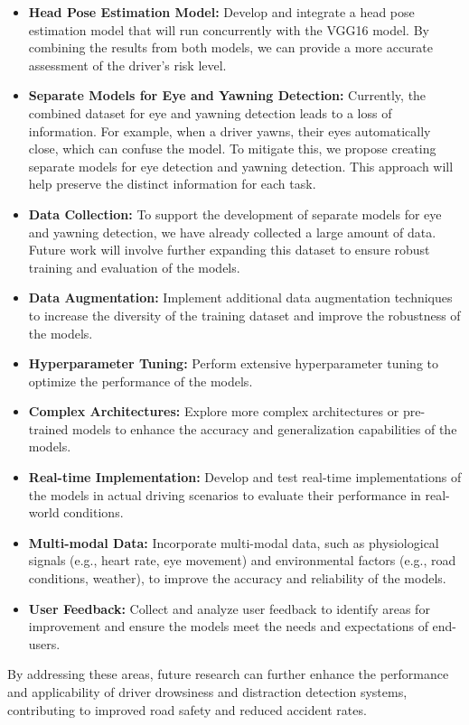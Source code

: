 \begin{itemize}
    \item \textbf{Head Pose Estimation Model:} Develop and integrate a head pose estimation model that will run concurrently with the VGG16 model. By combining the results from both models, we can provide a more accurate assessment of the driver's risk level.
    \item \textbf{Separate Models for Eye and Yawning Detection:} Currently, the combined dataset for eye and yawning detection leads to a loss of information. For example, when a driver yawns, their eyes automatically close, which can confuse the model. To mitigate this, we propose creating separate models for eye detection and yawning detection. This approach will help preserve the distinct information for each task.
    \item \textbf{Data Collection:} To support the development of separate models for eye and yawning detection, we have already collected a large amount of data. Future work will involve further expanding this dataset to ensure robust training and evaluation of the models.
    \item \textbf{Data Augmentation:} Implement additional data augmentation techniques to increase the diversity of the training dataset and improve the robustness of the models.
    \item \textbf{Hyperparameter Tuning:} Perform extensive hyperparameter tuning to optimize the performance of the models.
    \item \textbf{Complex Architectures:} Explore more complex architectures or pre-trained models to enhance the accuracy and generalization capabilities of the models.
    \item \textbf{Real-time Implementation:} Develop and test real-time implementations of the models in actual driving scenarios to evaluate their performance in real-world conditions.
    \item \textbf{Multi-modal Data:} Incorporate multi-modal data, such as physiological signals (e.g., heart rate, eye movement) and environmental factors (e.g., road conditions, weather), to improve the accuracy and reliability of the models.
    \item \textbf{User Feedback:} Collect and analyze user feedback to identify areas for improvement and ensure the models meet the needs and expectations of end-users.
\end{itemize}

By addressing these areas, future research can further enhance the performance and applicability of driver drowsiness and distraction detection systems, contributing to improved road safety and reduced accident rates.

